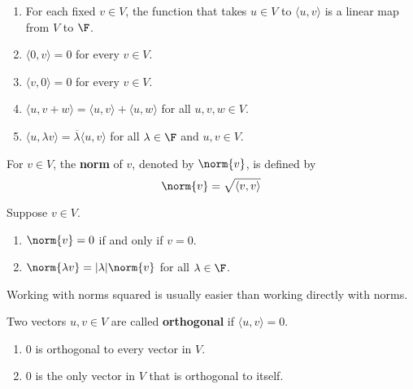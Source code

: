 \documentclass{extarticle}
\begin{document}
\begin{corollary}
    \begin{enumerate}[label=(\alph*)]
        \item For each fixed \(v \in V\), the function that takes \(u \in V\) to
        \(\langle u,v \rangle\) is a linear map from \(V\) to \(\F\).
        \item \(\langle 0,v \rangle = 0\) for every \(v \in V\).
        \item \(\langle v,0 \rangle = 0\) for every \(v \in V\).
        \item \(\langle u,v + w \rangle = \langle u,v \rangle + \langle u,w \rangle\)
        for all \(u, v, w \in V\).
        \item \(\langle u,\lambda v \rangle = \overline{\lambda} \langle u,v \rangle\)
        for all \(\lambda \in \F\) and \(u, v \in V\).
    \end{enumerate}
\end{corollary}

\begin{definition}
    For \(v \in V\), the \textbf{norm} of \(v\), denoted by \(\norm{v}\), is defined by
    \[\norm{v} = \sqrt{\langle v,v \rangle}\]
\end{definition}

\begin{corollary}
    Suppose \(v \in V\).
    \begin{enumerate}[label=(\alph*)]
        \item \(\norm{v} = 0\) if and only if \(v = 0\).
        \item \(\norm{\lambda v} = |\lambda| \norm{v}\) for all \(\lambda \in \F\).
    \end{enumerate}
\end{corollary}

\begin{remark}
    Working with norms squared is usually easier than working directly with norms.
\end{remark}

\begin{definition}[orthogonal]
    Two vectors \(u, v \in V\) are called \textbf{orthogonal} if \(\langle u,v \rangle = 0\).
\end{definition}

\begin{corollary}
    \begin{enumerate}[label=(\alph*)]
        \item 0 is orthogonal to every vector in \(V\).
        \item 0 is the only vector in \(V\) that is orthogonal to itself.
    \end{enumerate}
\end{corollary}
\end{document}

